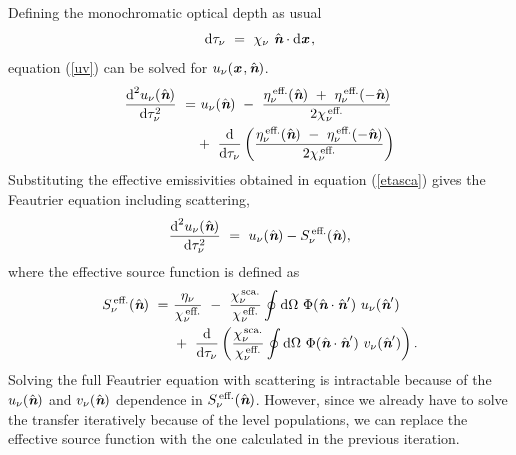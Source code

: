 \documentclass[a4paper,fleqn,usenatbib]{mnras}
\newcommand{\D}{\text{d}}
\newcommand{\x}{{\textit{\textbf{x}}}\,}
\newcommand{\n}{\hat{\textit{\textbf{n}}}}
\begin{document}
Defining the monochromatic optical depth as usual
\begin{equation}
	\D\tau_{\nu} \ = \ \chi_{\nu} \ \n \cdot \D \x,
\end{equation}
equation (\ref{uv}) can be solved for $u_{\nu}(\x,\n)$.
\begin{equation}
\begin{split}
	\frac{\D^{2} u_{\nu}(\n)}{\D \tau_{\nu}^{2}} \ = & \ u_{\nu}(\n) \ - \ \frac{ \eta^{\,\text{eff.}}_{\nu}(\n) \ + \ \eta^{\,\text{eff.}}_{\nu}(-\n) }{ 2\chi^{\,\text{eff.}}_{\nu} } \\
	\ &+ \ \frac{\D}{\D\tau_{\nu}} \left( \frac{ \eta^{\,\text{eff.}}_{\nu}(\n) \ - \ \eta^{\,\text{eff.}}_{\nu}(-\n) }{ 2\chi^{\,\text{eff.}}_{\nu} } \right)
\end{split}
\end{equation}
Substituting the effective emissivities obtained in equation (\ref{etasca}) gives the Feautrier equation including scattering,
\begin{equation}
\begin{split}
	\frac{\D^{2} u_{\nu}(\n)}{\D \tau_{\nu}^{2}} \ = \ u_{\nu}(\n) - S^{\,\text{eff.}}_{\nu}(\n),
\end{split}
\end{equation}
where the effective source function is defined as
\begin{equation}
\begin{split}
	S^{\,\text{eff.}}_{\nu}(\n) \ = & \ \frac{\eta_{\nu}}{\chi^{\,\text{eff.}}_{\nu}} \ - \ \frac{  \chi^{\,\text{sca.}}_{\nu}}{ \chi^{\,\text{eff.}}_{\nu}} \oint \D\Omega \ \Phi(\n\cdot\n') \ u_{\nu}(\n') \\
	& \ + \ \frac{\D}{\D\tau_{\nu}}  \left( \frac{  \chi^{\,\text{sca.}}_{\nu}}{ \chi^{\,\text{eff.}}_{\nu}} \oint \D\Omega \ \Phi(\n\cdot\n') \ v_{\nu}(\n') \right).
\end{split}
\end{equation}
Solving the full Feautrier equation with scattering is intractable because of the $u_{\nu}(\n)$ and $v_{\nu}(\n)$ dependence in $S^{\,\text{eff.}}_{\nu}(\n)$. However, since we already have to solve the transfer iteratively because of the level populations, we can replace the effective source function with the one calculated in the previous iteration.
\end{document}
